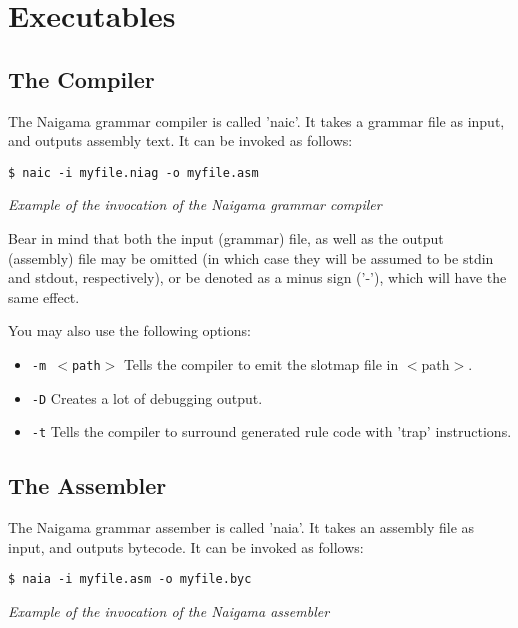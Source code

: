 \section{Executables}

\subsection{The Compiler}

The Naigama grammar compiler is called 'naic'.
It takes a grammar file as input, and outputs assembly text.
It can be invoked as follows:

\begin{myquote}
\begin{verbatim}
$ naic -i myfile.niag -o myfile.asm
\end{verbatim}
\end{myquote}
\textit{Example of the invocation of the Naigama grammar compiler}

Bear in mind that both the input (grammar) file, as well as the
output (assembly) file may be omitted (in which case they will be
assumed to be stdin and stdout, respectively), or be denoted as
a minus sign ('-'), which will have the same effect.

You may also use the following options:

\begin{itemize}
\item \texttt{-m $<$path$>$} Tells the compiler to emit the slotmap
      file in $<$path$>$.
\item \texttt{-D} Creates a lot of debugging output.
\item \texttt{-t} Tells the compiler to surround generated rule
      code with 'trap' instructions.
\end{itemize}

\subsection{The Assembler}

The Naigama grammar assember is called 'naia'.
It takes an assembly file as input, and outputs bytecode.
It can be invoked as follows:

\begin{myquote}
\begin{verbatim}
$ naia -i myfile.asm -o myfile.byc
\end{verbatim}
\end{myquote}
\textit{Example of the invocation of the Naigama assembler}

